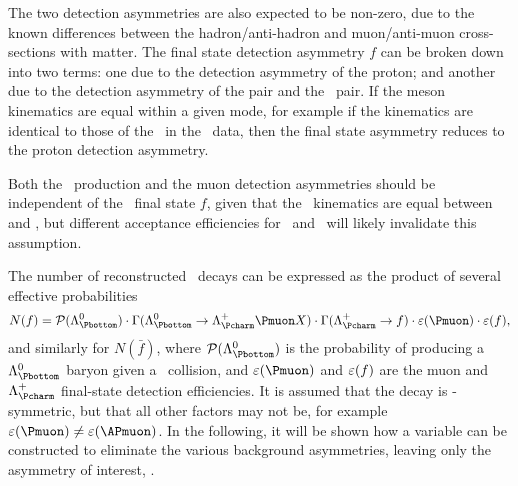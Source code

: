 The two detection asymmetries are also expected to be non-zero, due to the 
known differences between the hadron/anti-hadron and muon/anti-muon 
cross-sections with matter.
The final state detection asymmetry $f$ can be broken down into two terms: one 
due to the detection asymmetry of the proton; and another due to the detection 
asymmetry of the \KmKp pair and the \pimpip\ pair.
If the meson kinematics are equal within a given mode, for example if the 
\PKminus kinematics are identical to those of the \PKplus\ in the \pKK\ data, 
then the final state asymmetry reduces to the proton detection asymmetry.

Both the \PLambdab\ production and the muon detection asymmetries should be 
independent of the \PLambdac\ final state $f$, given that the \PLambdac\ 
kinematics are equal between \pKK and \ppipi, but different acceptance 
efficiencies for \pKK\ and \ppipi\ will likely invalidate this assumption.

The number of reconstructed \LcTof\ decays can be expressed as the product of 
several effective probabilities
\begin{equation}
  N(f) = \prob(\PLambdab)\cdot
         \Gamma(\LbToLcmuX)\cdot
         \Gamma(\LcTof)\cdot
         \eff(\Pmuon)\cdot
         \eff(f),
  \label{eqn:cpv:theory:yield}
\end{equation}
and similarly for $N(\bar{f})$, where $\prob(\PLambdab)$ is the probability of 
producing a $\PLambdab$ baryon given a \pp\ collision, and $\eff(\Pmuon)$ and 
$\varepsilon(f)$ are the muon and $\PLambdac$ final-state detection efficiencies.
It is assumed that the \LbToLcmuX decay is \CP-symmetric, but that all other 
factors may not be, for example $\eff(\Pmuon) \neq \eff(\APmuon)$.
In the following, it will be shown how a variable can be constructed to 
eliminate the various background asymmetries, leaving only the asymmetry of 
interest, \ACP\@.

